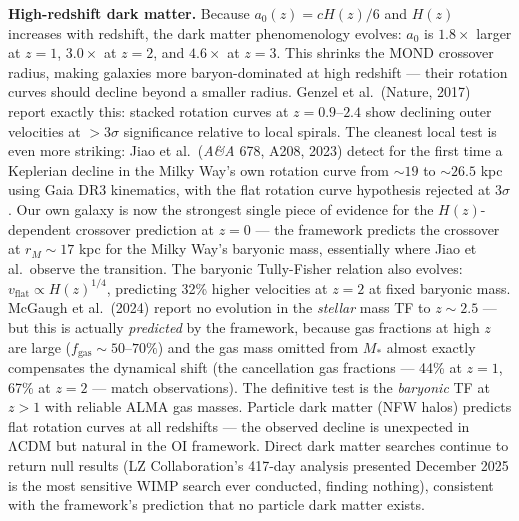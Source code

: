 \documentclass[
]{article}
\begin{document}
\textbf{High-redshift dark matter.} Because \(a_0(z) = cH(z)/6\) and
\(H(z)\) increases with redshift, the dark matter phenomenology evolves:
\(a_0\) is \(1.8\times\) larger at \(z = 1\), \(3.0\times\) at
\(z = 2\), and \(4.6\times\) at \(z = 3\). This shrinks the MOND
crossover radius, making galaxies more baryon-dominated at high redshift
--- their rotation curves should decline beyond a smaller radius. Genzel
et al.~(Nature, 2017) report exactly this: stacked rotation curves at
\(z = 0.9\)--\(2.4\) show declining outer velocities at \(> 3\sigma\)
significance relative to local spirals. The cleanest local test is even
more striking: Jiao et al.~(\emph{A\&A} 678, A208, 2023) detect for the
first time a Keplerian decline in the Milky Way's own rotation curve
from \(\sim 19\) to \(\sim 26.5\) kpc using Gaia DR3 kinematics, with
the flat rotation curve hypothesis rejected at \(3\sigma\). Our own
galaxy is now the strongest single piece of evidence for the
\(H(z)\)-dependent crossover prediction at \(z = 0\) --- the framework
predicts the crossover at \(r_M \sim 17\) kpc for the Milky Way's
baryonic mass, essentially where Jiao et al.~observe the transition. The
baryonic Tully-Fisher relation also evolves:
\(v_{\text{flat}} \propto H(z)^{1/4}\), predicting 32\% higher
velocities at \(z = 2\) at fixed baryonic mass. McGaugh et al.~(2024)
report no evolution in the \emph{stellar} mass TF to \(z \sim 2.5\) ---
but this is actually \emph{predicted} by the framework, because gas
fractions at high \(z\) are large (\(f_{\text{gas}} \sim 50\)--\(70\%\))
and the gas mass omitted from \(M_*\) almost exactly compensates the
dynamical shift (the cancellation gas fractions --- 44\% at \(z = 1\),
67\% at \(z = 2\) --- match observations). The definitive test is the
\emph{baryonic} TF at \(z > 1\) with reliable ALMA gas masses. Particle
dark matter (NFW halos) predicts flat rotation curves at all redshifts
--- the observed decline is unexpected in ΛCDM but natural in the OI
framework. Direct dark matter searches continue to return null results
(LZ Collaboration's 417-day analysis presented December 2025 is the most
sensitive WIMP search ever conducted, finding nothing), consistent with
the framework's prediction that no particle dark matter exists.
\end{document}
